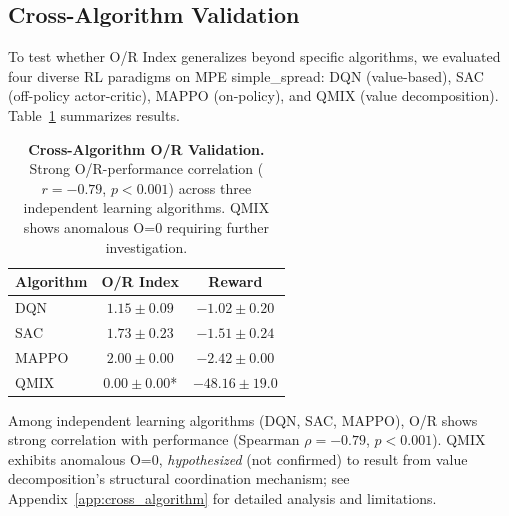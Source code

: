 
\subsection{Cross-Algorithm Validation}
\label{sec:cross_algorithm}

To test whether O/R Index generalizes beyond specific algorithms, we evaluated four diverse RL paradigms on MPE simple\_spread: DQN (value-based), SAC (off-policy actor-critic), MAPPO (on-policy), and QMIX (value decomposition). Table~\ref{tab:cross_algorithm_condensed} summarizes results.

\begin{table}[h]
\centering
\caption{\textbf{Cross-Algorithm O/R Validation.} Strong O/R-performance correlation ($r = -0.79$, $p < 0.001$) across three independent learning algorithms. QMIX shows anomalous O=0 requiring further investigation.}
\label{tab:cross_algorithm_condensed}
\begin{tabular}{lcc}
\toprule
\textbf{Algorithm} & \textbf{O/R Index} & \textbf{Reward} \\
\midrule
DQN & $1.15 \pm 0.09$ & $-1.02 \pm 0.20$ \\
SAC & $1.73 \pm 0.23$ & $-1.51 \pm 0.24$ \\
MAPPO & $2.00 \pm 0.00$ & $-2.42 \pm 0.00$ \\
QMIX & $0.00 \pm 0.00$* & $-48.16 \pm 19.0$ \\
\bottomrule
\end{tabular}
\end{table}

\noindent Among independent learning algorithms (DQN, SAC, MAPPO), O/R shows strong correlation with performance (Spearman $\rho = -0.79$, $p < 0.001$). QMIX exhibits anomalous O=0, \textit{hypothesized} (not confirmed) to result from value decomposition's structural coordination mechanism; see Appendix~\ref{app:cross_algorithm} for detailed analysis and limitations.
